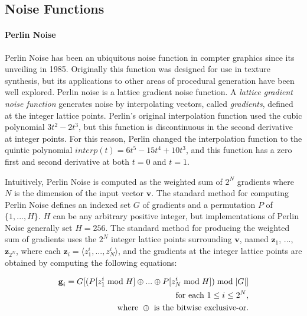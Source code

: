 \documentclass[12pt]{article}
\theoremstyle{definition}
\theoremstyle{remark}
\begin{document}
\subsection{Noise Functions}

\paragraph{Perlin Noise}

Perlin Noise\cite{perlin1985} has been an ubiquitous noise function in compter graphics since its unveiling in 1985. Originally this function was designed for use in texture synthesis\cite{perlin1985, perlin1989}, but its applications to other areas of procedural generation have been well explored\cite{lagaeetal2010, smelik2014}. Perlin noise is a lattice gradient noise function. A \textit{lattice gradient noise function} generates noise by interpolating vectors, called \textit{gradients}, defined at the integer lattice points. Perlin's original interpolation function used the cubic polynomial $3t^2-2t^3$\cite{perlin1985}, but this function is discontinuous in the second derivative at integer points. For this reason, Perlin changed the interpolation function to the quintic polynomial $interp(t)=6t^5-15t^4+10t^3$, and this function has a zero first and second derivative at both $t=0$ and $t=1$\cite{perlin2002}.

Intuitively, Perlin Noise is computed as the weighted sum of $2^N$ gradients where $N$ is the dimension of the input vector $\textbf{v}$. The standard method for computing Perlin Noise defines an indexed set $G$ of gradients and a permutation $P$ of $\{1, ..., H\}$. $H$ can be any arbitrary positive integer, but implementations of Perlin Noise generally set $H=256$. The standard method for producing the weighted sum of gradients uses the $2^N$ integer lattice points surrounding $\textbf{v}$, named $\textbf{z}_1$, ..., $\textbf{z}_{2^N}$, where each $\textbf{z}_i = \langle z^i_1, ..., z^i_N \rangle$, and the gradients at the integer lattice points are obtained by computing the following equations:

\begin{align*}
	\textbf{g}_i = G[(P[z^i_1 \; \textnormal{mod} \; H] \oplus ... \oplus P[z^i_N \; \textnormal{mod} \; H]) \; \textnormal{mod} \; |G|] \\
	\textnormal{for each } 1 \leq i \leq 2^N, \\
	\textnormal{where } \oplus \textnormal{ is the bitwise exclusive-or.}
\end{align*}
\end{document}

